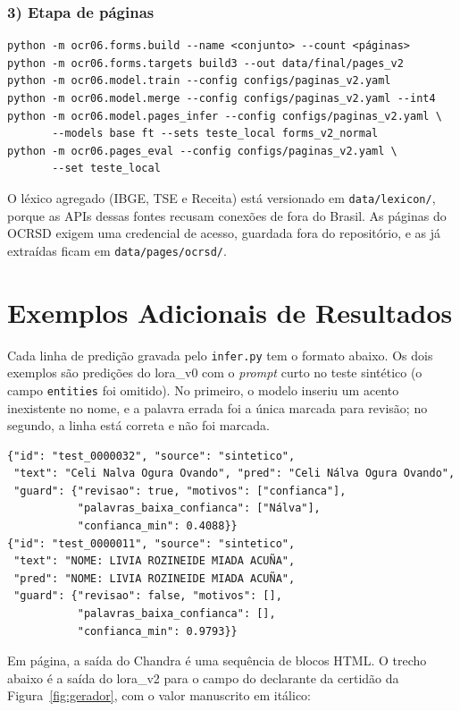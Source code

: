 \documentclass[12pt,a4paper]{article}
\begin{document}
\subsubsection*{3) Etapa de páginas}
{\footnotesize
\begin{verbatim}
python -m ocr06.forms.build --name <conjunto> --count <páginas>
python -m ocr06.forms.targets build3 --out data/final/pages_v2
python -m ocr06.model.train --config configs/paginas_v2.yaml
python -m ocr06.model.merge --config configs/paginas_v2.yaml --int4
python -m ocr06.model.pages_infer --config configs/paginas_v2.yaml \
       --models base ft --sets teste_local forms_v2_normal
python -m ocr06.pages_eval --config configs/paginas_v2.yaml \
       --set teste_local
\end{verbatim}
}

O léxico agregado (IBGE, TSE e Receita) está versionado em \texttt{data/lexicon/}, porque as APIs dessas fontes recusam conexões de fora do Brasil. As páginas do OCRSD exigem uma credencial de acesso, guardada fora do repositório, e as já extraídas ficam em \texttt{data/pages/ocrsd/}.

\section{Exemplos Adicionais de Resultados}
\label{app:exemplos}

Cada linha de predição gravada pelo \texttt{infer.py} tem o formato abaixo. Os dois exemplos são predições do lora\_v0 com o \emph{prompt} curto no teste sintético (o campo \texttt{entities} foi omitido). No primeiro, o modelo inseriu um acento inexistente no nome, e a palavra errada foi a única marcada para revisão; no segundo, a linha está correta e não foi marcada.

{\footnotesize
\begin{verbatim}
{"id": "test_0000032", "source": "sintetico",
 "text": "Celi Nalva Ogura Ovando", "pred": "Celi Nálva Ogura Ovando",
 "guard": {"revisao": true, "motivos": ["confianca"],
           "palavras_baixa_confianca": ["Nálva"],
           "confianca_min": 0.4088}}
{"id": "test_0000011", "source": "sintetico",
 "text": "NOME: LIVIA ROZINEIDE MIADA ACUÑA",
 "pred": "NOME: LIVIA ROZINEIDE MIADA ACUÑA",
 "guard": {"revisao": false, "motivos": [],
           "palavras_baixa_confianca": [],
           "confianca_min": 0.9793}}
\end{verbatim}
}

Em página, a saída do Chandra é uma sequência de blocos HTML. O trecho abaixo é a saída do lora\_v2 para o campo do declarante da certidão da Figura~\ref{fig:gerador}, com o valor manuscrito em itálico:
\end{document}
